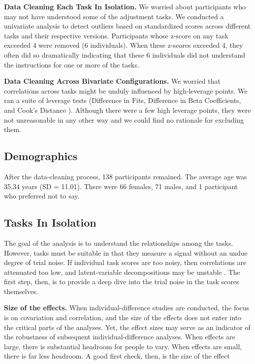 {\bf Data Cleaning Each Task In Isolation.} We worried about participants who may not have understood some of the adjustment tasks.   We conducted a univariate analysis to detect outliers based on standardized scores across different tasks and their respective versions. Participants whose z-score on any task exceeded 4 were removed (6 individuals).   When these z-scores exceeded 4, they often did so dramatically indicating that these 6 individuals did not understand the instructions for one or more of the tasks.


{\bf Data Cleaning Across Bivariate Configurations.} We worried that correlations across tasks might be unduly influenced by high-leverage points.  We ran a suite of leverage tests (Difference in Fits, Difference in Beta Coefficients, and Cook’s Distance \parencite{Belsley.etal.1980}).  Although there were a few high leverage points, they were not unreasonable in any other way and we could find no rationale for excluding them.

\subsection{Demographics}

After the data-cleaning process, 138 participants remained. The average age was 35.34 years (SD = 11.01). There were 66 females, 71 males, and 1 participant who preferred not to say.

\subsection{Tasks In Isolation}


The goal of the analysis is to understand the relationships among the tasks. However, tasks must be suitable in that they measure a signal without an undue degree of trial noise. If individual task scores are too noisy, then correlations are attenuated too low, and latent-variable decompositions may be unstable \parencite[]{Karr.etal.2018,Rouder.etal.2023}. The first step, then, is to provide a deep dive into the trial noise in the task scores themselves.


{\bf Size of the effects.}  When individual-difference studies are conducted, the focus is on covariation and correlation, and the size of the effects does not enter into the critical parts of the analyses.  Yet, the effect sizes may serve as an indicator of the robustness of subsequent individual-difference analyses.  When effects are large, there is substantial headroom for people to vary. When effects are small, there is far less headroom. A good first check, then, is the size of the effect

